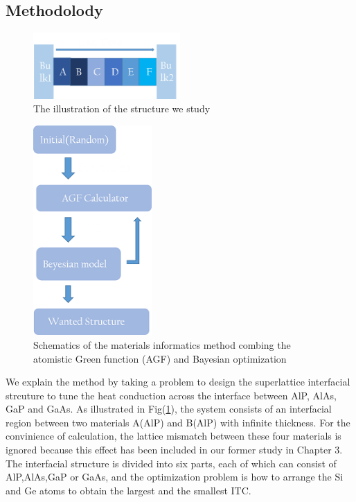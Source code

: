 \subsection{Methodolody}
\begin{figure}

\centering
\includegraphics[width=0.5\textwidth]{device.png}
\caption{The illustration of the structure we study}
\label{fig:agfdevice}
\end{figure}
\begin{figure}
\centering
\includegraphics[height=8cm]{map.png}
\caption{Schematics of the materials informatics method combing the atomistic Green function (AGF) and Bayesian optimization}
\label{fig:agfmap}

\end{figure}
We explain the method by taking a problem to design the superlattice interfacial strcuture to tune the heat conduction across the interface between AlP, AlAs, GaP and GaAs. As illustrated in Fig(\ref{fig:agfdevice}), the system consists of an interfacial region between two materials A(AlP) and B(AlP) with infinite thickness. For the convinience of calculation, the lattice mismatch between these four materials is ignored because this effect has been included in our former study in Chapter 3.
The interfacial structure is divided into six parts, each of which can consist of AlP,AlAs,GaP or GaAs, and the optimization problem is how to arrange the Si and Ge atoms to obtain the largest and the smallest ITC.\\
